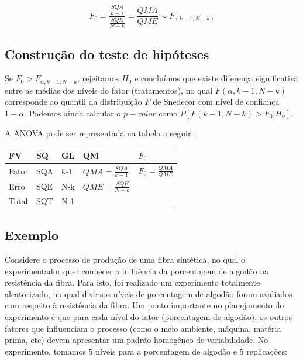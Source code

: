 \documentclass[
]{book}
\begin{document}
\[F_0=\frac{\frac{SQA}{k-1}}{\frac{SQE}{N-k}}=\frac{QMA}{QME}\sim F_{(k-1;N-k)}\]

\hypertarget{construuxe7uxe3o-do-teste-de-hipuxf3teses}{%
\subsection{Construção do teste de hipóteses}\label{construuxe7uxe3o-do-teste-de-hipuxf3teses}}

Se \(F_0>F_{\alpha;k-1;N-k}\), rejeitamos \(H_0\) e concluímos que existe diferença significativa entre as médias dos níveis do fator (tratamentos), no qual \(F(\alpha,k-1,N-k)\) corresponde ao quantil da distribuição \(F\) de Snedecor com nível de confiança \(1-\alpha\). Podemos ainda calcular o \(p-valor\) como \(P[F(k-1,N-k)>F_0 | H_0]\).

A ANOVA pode ser representada na tabela a seguir:

\begin{longtable}[]{@{}lllll@{}}
\toprule
FV & SQ & GL & QM & \(F_0\) \\
\midrule
\endhead
Fator & SQA & k-1 & \(QMA=\frac{SQA}{k-1}\) & \(F_0=\frac{QMA}{QME}\) \\
Erro & SQE & N-k & \(QME=\frac{SQE}{N-k}\) & \\
Total & SQT & N-1 & & \\
\bottomrule
\end{longtable}

\hypertarget{exemplo-19}{%
\subsection{Exemplo}\label{exemplo-19}}

Considere o processo de produção de uma fibra sintética, no qual o experimentador quer conhecer a influência da porcentagem de algodão na resistência da fibra. Para isto, foi realizado um experimento totalmente aleatorizado, no qual diversos níveis de porcentagem de algodão foram avaliados com respeito à resistência da fibra. Um ponto importante no planejamento do experimento é que para cada nível do fator (porcentagem de algodão), os outros fatores que influenciam o processo (como o meio ambiente, máquina, matéria prima, etc) devem apresentar um padrão homogêneo de variabilidade. No experimento, tomamos 5 níveis para a porcentagem de algodão e 5 replicações:
\end{document}

